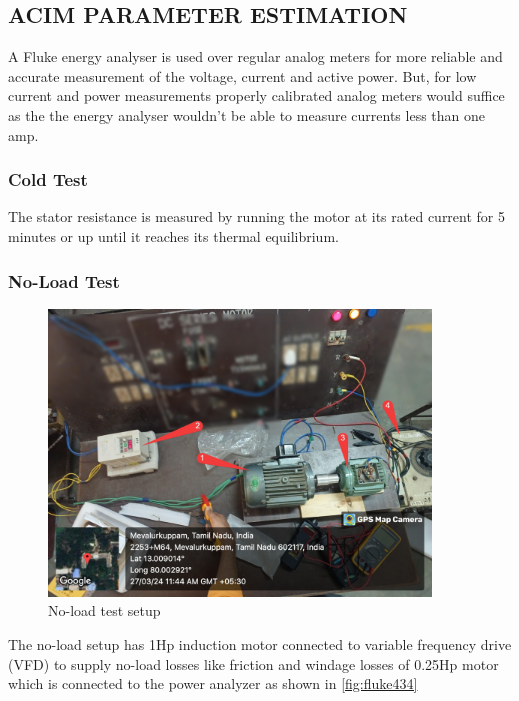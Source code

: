 \subsection{ACIM PARAMETER ESTIMATION}

A Fluke energy analyser is used over regular analog meters for more reliable and accurate measurement of the voltage, current and active power. But, for low current and power measurements properly calibrated analog meters would suffice as the the energy analyser wouldn’t be able to measure currents less than one amp.

\subsubsection{Cold Test}

The stator resistance is measured by running the motor at its rated current for 5 minutes or up until it reaches its thermal equilibrium.


\subsubsection{No-Load Test}


\begin{figure}[H]
	\centering
	\includegraphics[width=4in]{sections/section5/images/ParamEstim/SetupNoload.jpg}
	\caption{No-load test setup}
	\label{fig:no_load_test_setup}
\end{figure}

The no-load setup has 1Hp induction motor connected to variable frequency drive (VFD) to supply no-load losses like friction and windage losses of 0.25Hp motor which is connected to the power analyzer as shown in \ref*{fig:fluke434}


